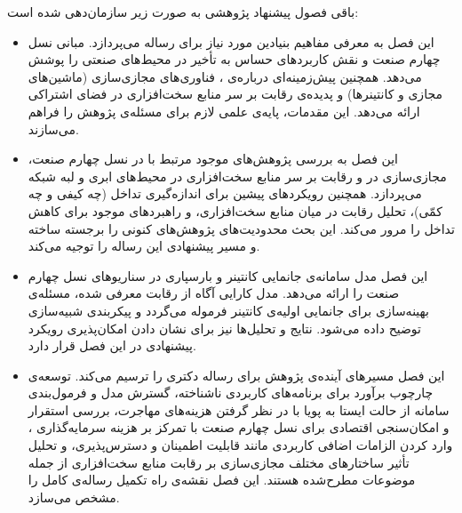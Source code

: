 باقی‌ فصول پیشنهاد پژوهشی به صورت زیر سازمان‌دهی شده است:
\begin{itemize}
\item
\textbf{}
این فصل به معرفی مفاهیم بنیادین مورد نیاز برای رساله می‌پردازد. مبانی نسل چهارم صنعت و نقش کاربردهای حساس به تأخیر در محیط‌های صنعتی را پوشش می‌دهد. همچنین پیش‌زمینه‌ای درباره‌ی ، فناوری‌های مجازی‌سازی (ماشین‌های مجازی و کانتینرها) و پدیده‌ی رقابت بر سر منابع سخت‌افزاری در فضای اشتراکی ارائه می‌دهد. این مقدمات، پایه‌ی علمی لازم برای مسئله‌ی پژوهش را فراهم می‌سازند.

\item
\textbf{}
این فصل به بررسی پژوهش‌های موجود مرتبط با  در نسل چهارم صنعت، مجازی‌سازی در  و رقابت بر سر منابع سخت‌افزاری در محیط‌های ابری و لبه‌ شبکه می‌پردازد. همچنین رویکردهای پیشین برای اندازه‌گیری تداخل (چه کیفی و چه کمّی)، تحلیل رقابت در میان منابع سخت‌افزاری، و راهبردهای موجود برای کاهش تداخل را مرور می‌کند. این بحث محدودیت‌های پژوهش‌های کنونی را برجسته ساخته و مسیر پیشنهادی این رساله را توجیه می‌کند.

\item
\textbf{}
این فصل مدل سامانه‌ی جانمایی کانتینر و بارسپاری در سناریوهای  نسل چهارم صنعت را ارائه می‌دهد. مدل کارایی آگاه از رقابت معرفی شده، مسئله‌ی بهینه‌سازی برای جانمایی اولیه‌ی کانتینر فرموله می‌گردد و پیکربندی شبیه‌سازی توضیح داده می‌شود. نتایج و تحلیل‌ها نیز برای نشان دادن امکان‌پذیری رویکرد پیشنهادی در این فصل قرار دارد.

\item
\textbf{}
این فصل مسیرهای آینده‌ی پژوهش برای رساله دکتری را ترسیم می‌کند. توسعه‌ی چارچوب برآورد برای برنامه‌های کاربردی ناشناخته، گسترش مدل و فرمول‌بندی سامانه از حالت ایستا به پویا با در نظر گرفتن هزینه‌های مهاجرت، بررسی استقرار و امکان‌سنجی اقتصادی  برای نسل چهارم صنعت با تمرکز بر هزینه سرمایه‌گذاری ، وارد کردن الزامات اضافی کاربردی مانند قابلیت اطمینان و دسترس‌پذیری، و تحلیل تأثیر ساختارهای مختلف مجازی‌سازی بر رقابت منابع سخت‌افزاری از جمله موضوعات مطرح‌شده هستند. این فصل نقشه‌ی راه تکمیل رساله‌ی کامل را مشخص می‌سازد.

\end{itemize}
